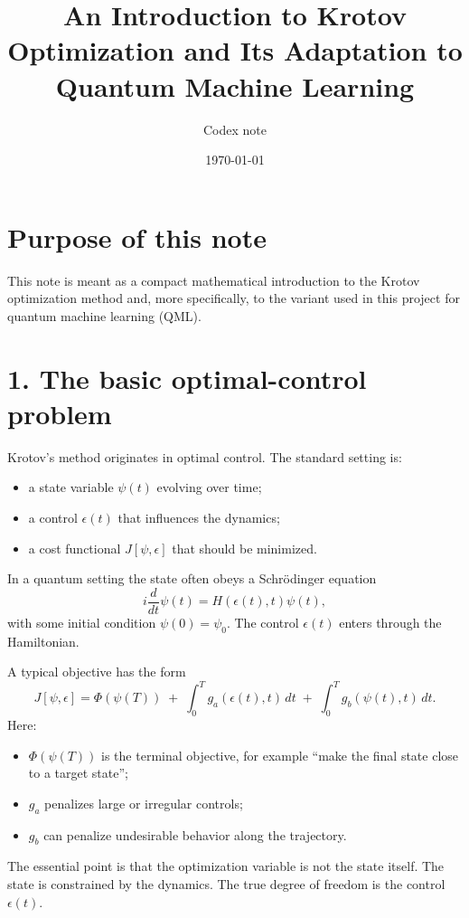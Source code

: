 \documentclass[11pt]{article}
\title{An Introduction to Krotov Optimization and Its Adaptation to Quantum Machine Learning}
\author{Codex note}
\date{\today}
\begin{document}
\maketitle

\section*{Purpose of this note}
This note is meant as a compact mathematical introduction to the Krotov optimization method and, more specifically, to the variant used in this project for quantum machine learning (QML). 

\section*{1. The basic optimal-control problem}
Krotov's method originates in optimal control. The standard setting is:
\begin{itemize}
\item a state variable $\psi(t)$ evolving over time;
\item a control $\epsilon(t)$ that influences the dynamics;
\item a cost functional $J[\psi,\epsilon]$ that should be minimized.
\end{itemize}

In a quantum setting the state often obeys a Schr\"odinger equation
\begin{equation}
i \frac{d}{dt}\psi(t) = H(\epsilon(t), t)\psi(t),
\end{equation}
with some initial condition $\psi(0)=\psi_0$. The control $\epsilon(t)$ enters through the Hamiltonian.

A typical objective has the form
\begin{equation}
J[\psi,\epsilon]
=
\Phi(\psi(T))
\;+\;
\int_0^T g_a(\epsilon(t),t)\,dt
\;+\;
\int_0^T g_b(\psi(t),t)\,dt.
\label{eq:generic_cost}
\end{equation}
Here:
\begin{itemize}
\item $\Phi(\psi(T))$ is the terminal objective, for example ``make the final state close to a target state'';
\item $g_a$ penalizes large or irregular controls;
\item $g_b$ can penalize undesirable behavior along the trajectory.
\end{itemize}

The essential point is that the optimization variable is not the state itself. The state is constrained by the dynamics. The true degree of freedom is the control $\epsilon(t)$.
\end{document}
